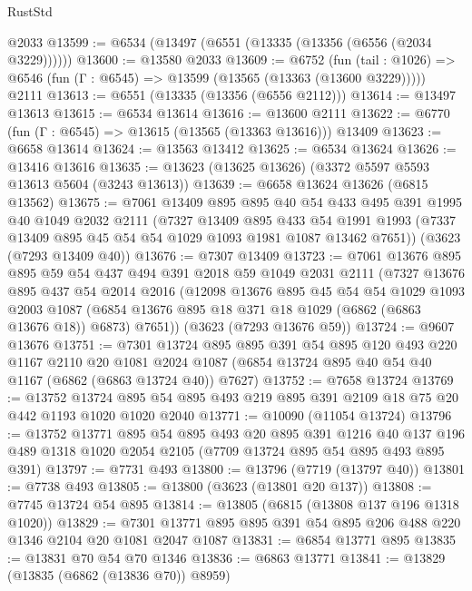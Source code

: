 \begin{lexlean}{RustStd}
\begin{coremodule}
    @2033
@13599 := @6534 (@13497 (@6551 (@13335 (@13356 (@6556 (@2034 @3229))))))
@13600 := @13580 @2033
@13609 := @6752
    (fun (tail : @1026) => @6546 (fun (Γ : @6545) => @13599 (@13565 (@13363 (@13600 @3229)))))
    @2111
@13613 := @6551 (@13335 (@13356 (@6556 @2112)))
@13614 := @13497 @13613
@13615 := @6534 @13614
@13616 := @13600 @2111
@13622 := @6770 (fun (Γ : @6545) => @13615 (@13565 (@13363 @13616))) @13409
@13623 := @6658 @13614
@13624 := @13563 @13412
@13625 := @6534 @13624
@13626 := @13416 @13616
@13635 := @13623 (@13625 @13626) (@3372 @5597 @5593 @13613 @5604 (@3243 @13613))
@13639 := @6658 @13624 @13626 (@6815 @13562)
@13675 := @7061
    @13409
    @895
    @895
    @40
    @54
    @433
    @495
    @391
    @1995
    @40
    @1049
    @2032
    @2111
    (@7327
      @13409
      @895
      @433
      @54
      @1991
      @1993
      (@7337 @13409 @895 @45 @54 @54 @1029 @1093 @1981 @1087 @13462 @7651))
    (@3623 (@7293 @13409 @40))
@13676 := @7307 @13409
@13723 := @7061
    @13676
    @895
    @895
    @59
    @54
    @437
    @494
    @391
    @2018
    @59
    @1049
    @2031
    @2111
    (@7327
      @13676
      @895
      @437
      @54
      @2014
      @2016
      (@12098
        @13676
        @895
        @45
        @54
        @54
        @1029
        @1093
        @2003
        @1087
        (@6854 @13676 @895 @18 @371 @18 @1029 (@6862 (@6863 @13676 @18)) @6873)
        @7651))
    (@3623 (@7293 @13676 @59))
@13724 := @9607 @13676
@13751 := @7301
    @13724
    @895
    @895
    @391
    @54
    @895
    @120
    @493
    @220
    @1167
    @2110
    @20
    @1081
    @2024
    @1087
    (@6854 @13724 @895 @40 @54 @40 @1167 (@6862 (@6863 @13724 @40)) @7627)
@13752 := @7658 @13724
@13769 := @13752
    @13724
    @895
    @54
    @895
    @493
    @219
    @895
    @391
    @2109
    @18
    @75
    @20
    @442
    @1193
    @1020
    @1020
    @2040
@13771 := @10090 (@11054 @13724)
@13796 := @13752
    @13771
    @895
    @54
    @895
    @493
    @20
    @895
    @391
    @1216
    @40
    @137
    @196
    @489
    @1318
    @1020
    @2054
    @2105
    (@7709 @13724 @895 @54 @895 @493 @895 @391)
@13797 := @7731 @493
@13800 := @13796 (@7719 (@13797 @40))
@13801 := @7738 @493
@13805 := @13800 (@3623 (@13801 @20 @137))
@13808 := @7745 @13724 @54 @895
@13814 := @13805 (@6815 (@13808 @137 @196 @1318 @1020))
@13829 := @7301 @13771 @895 @895 @391 @54 @895 @206 @488 @220 @1346 @2104 @20 @1081 @2047 @1087
@13831 := @6854 @13771 @895
@13835 := @13831 @70 @54 @70 @1346
@13836 := @6863 @13771
@13841 := @13829 (@13835 (@6862 (@13836 @70)) @8959)

\end{coremodule}
\end{lexlean}
